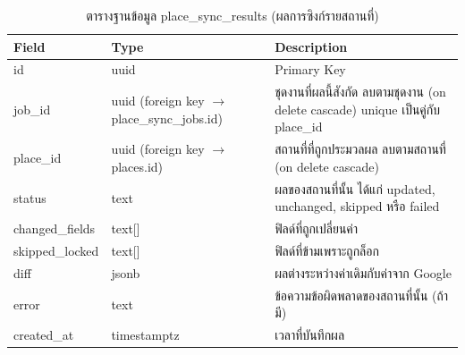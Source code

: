 \begin{table}[H]
\centering
\caption{ตารางฐานข้อมูล place\_sync\_results (ผลการซิงก์รายสถานที่)}
\label{tab:db_syncresults}
\begin{tabular}{|p{3.6cm}|p{2.6cm}|p{6.8cm}|}
\hline
\textbf{Field} & \textbf{Type} & \textbf{Description} \\
\hline
id & uuid & Primary Key \\ \hline
job\_id & uuid (foreign key $\to$ place\_sync\_jobs.id) & ชุดงานที่ผลนี้สังกัด ลบตามชุดงาน (on delete cascade) unique เป็นคู่กับ place\_id \\ \hline
place\_id & uuid (foreign key $\to$ places.id) & สถานที่ที่ถูกประมวลผล ลบตามสถานที่ (on delete cascade) \\ \hline
status & text & ผลของสถานที่นั้น ได้แก่ updated, unchanged, skipped หรือ failed \\ \hline
changed\_fields & text[] & ฟิลด์ที่ถูกเปลี่ยนค่า \\ \hline
skipped\_locked & text[] & ฟิลด์ที่ข้ามเพราะถูกล็อก \\ \hline
diff & jsonb & ผลต่างระหว่างค่าเดิมกับค่าจาก Google \\ \hline
error & text & ข้อความข้อผิดพลาดของสถานที่นั้น (ถ้ามี) \\ \hline
created\_at & timestamptz & เวลาที่บันทึกผล \\
\hline
\end{tabular}
\end{table}

